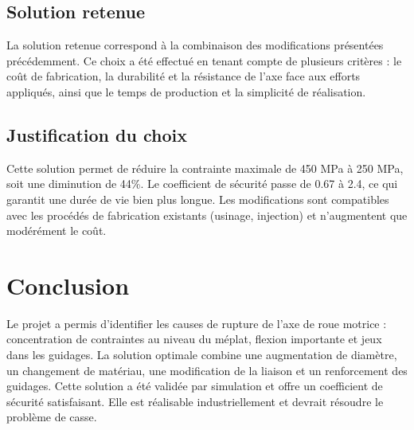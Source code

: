 \documentclass{rapportECL}
\begin{document}
\subsection{Solution retenue}

La solution retenue correspond à la combinaison des modifications présentées précédemment.  
Ce choix a été effectué en tenant compte de plusieurs critères : le coût de fabrication, la durabilité et la résistance de l’axe face aux efforts appliqués, ainsi que le temps de production et la simplicité de réalisation.





\subsection{Justification du choix}
Cette solution permet de réduire la contrainte maximale de 450 MPa à 250 MPa, soit une diminution de 44\%. Le coefficient de sécurité passe de 0.67 à 2.4, ce qui garantit une durée de vie bien plus longue. Les modifications sont compatibles avec les procédés de fabrication existants (usinage, injection) et n'augmentent que modérément le coût.

 

\section{Conclusion}
Le projet a permis d'identifier les causes de rupture de l'axe de roue motrice : concentration de contraintes au niveau du méplat, flexion importante et jeux dans les guidages. La solution optimale combine une augmentation de diamètre, un changement de matériau, une modification de la liaison et un renforcement des guidages. Cette solution a été validée par simulation et offre un coefficient de sécurité satisfaisant. Elle est réalisable industriellement et devrait résoudre le problème de casse.
\end{document}
